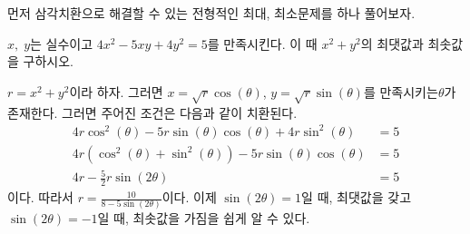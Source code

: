 \documentclass[11pt, a4paper]{book}
\begin{document}
먼저 삼각치환으로 해결할 수 있는 전형적인 최대, 최소문제를 하나 풀어보자.

\vspace{1em}
\begin{example}
	$x, \;y$는 실수이고 $4x^{2} - 5 xy + 4 y^{2} = 5$를 만족시킨다. 이 때 $x^{2} + y^{2}$의 최댓값과 최솟값을 구하시오.
	\begin{solution}
		$r=x^{2}+y^{2}$이라 하자. 그러면 $x=\sqrt{r}\cos(\theta)$, $y=\sqrt{r}\sin(\theta)$를 만족시키는$\theta$가 존재한다. 그러면 주어진 조건은 다음과 같이 치환된다.
		\begin{align*}
			4r \cos^{2}(\theta) - 5r \sin(\theta)\cos(\theta) + 4r \sin^{2}(\theta) &=5 \\
			4r\left(\cos^{2}(\theta)+\sin^{2}(\theta) \right) - 5r \sin(\theta)\cos(\theta) &=5 \\
			4r - \frac{5}{2} r \sin(2\theta) &=5
		\end{align*}
이다. 따라서 $r=\frac{10}{8-5\sin(2\theta)}$이다. 이제 $\sin(2\theta)=1$일 때, 최댓값을 갖고 $\sin(2\theta)=-1$일 때, 최솟값을 가짐을 쉽게 알 수 있다.
	\end{solution}
\end{example}
\vspace{1em}
\end{document}
